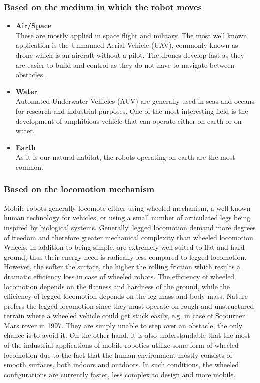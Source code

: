 \documentclass[12pt,english,twoside]{article}
\begin{document}
\subsubsection*{Based on the medium in which the robot moves}
\begin{itemize}
	\item \textbf{Air/Space} \\
		These are mostly applied in space flight and military. The most well known application is the Unmanned Aerial Vehicle (UAV), commonly known as drone which is an aircraft without a pilot. The drones develop fast as they are easier to build and control as they do not have to navigate between obstacles.
	\item \textbf{Water} \\
		Automated Underwater Vehicles (AUV) are generally used in seas and oceans for research and industrial purposes. One of the most interesting field is the development of amphibious vehicle that can operate either on earth or on water.
	\item \textbf{Earth} \\
		As it is our natural habitat, the robots operating on earth are the most common.	\cite{sieg} \cite{rirt}
\end{itemize}
\subsubsection*{Based on the locomotion mechanism}
Mobile robots generally locomote either using wheeled mechanism, a well-known human technology for vehicles, or using a small number of articulated legs being inspired by biological systems. Generally, legged locomotion demand more degrees of freedom and therefore greater mechanical complexity than wheeled locomotion. Wheels, in addition to being simple, are extremely well suited to flat and hard ground, thus their energy need is radically less compared to legged locomotion. However, the softer the surface, the higher the rolling friction which results a dramatic efficiency loss in case of wheeled robots. The efficiency of wheeled locomotion depends on the flatness and hardness of the ground, while the efficiency of legged locomotion depends on the leg mass and body mass. Nature prefers the legged locomotion since they must operate on rough and unstructured terrain where a wheeled vehicle could get stuck easily, e.g. in case of Sojourner Mars rover in 1997. They are simply unable to step over an obstacle, the only chance is to avoid it.
On the other hand, it is also understandable that the most of the industrial applications of mobile robotics utilize some form of wheeled locomotion due to the fact that the human environment mostly consists of smooth surfaces, both indoors and outdoors. In such conditions, the wheeled configurations are currently faster, less complex to design and more mobile.
\end{document}
